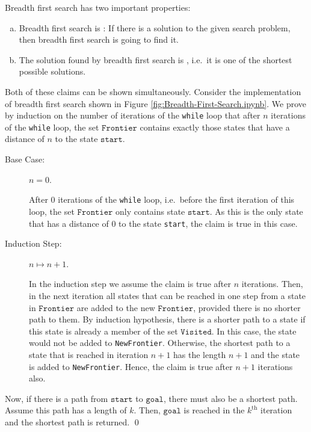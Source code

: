 Breadth first search has two important properties:
\begin{enumerate}[(a)]
\item Breadth first search is :  If there is a solution to the given
      search problem, then breadth first search is going to find it.
\item The solution found by breadth first search is ,  i.e.~it is one of the
      shortest possible solutions.
\end{enumerate}
\proof
Both of these claims can be shown simultaneously.  Consider the implementation of breadth first
search shown in Figure \ref{fig:Breadth-First-Search.ipynb}.  We prove by induction on the number of
iterations of the \texttt{while} loop that after $n$ iterations of the \texttt{while} loop,
the set $\texttt{Frontier}$ contains exactly those states that have a distance of $n$ to the state
$\texttt{start}$.  
\begin{description}
\item[Base Case:] $n = 0$.

      After $0$ iterations of the \texttt{while} loop, i.e.~before the first iteration of this loop,
      the set $\texttt{Frontier}$ only contains state $\texttt{start}$.  As this is the only state that has a
      distance of $0$ to the state \texttt{start}, the claim is true in this case.
\item[Induction Step:] $n \mapsto n+1$.

      In the induction step we assume the claim is true after $n$ iterations.  Then, in the next iteration all
      states that can be reached in one step from a state in $\texttt{Frontier}$ are added to the new $\texttt{Frontier}$,
      provided there is no shorter path to them.  By induction hypothesis, there is a shorter path to a state
      if this state is already a member of the set $\texttt{Visited}$.  In this case, the state would not be
      added to \texttt{NewFrontier}.  Otherwise, the shortest path to a state that is
      reached in iteration $n+1$ has the length $n+1$ and the state is added to \texttt{NewFrontier}.  Hence,
      the claim is true after $n+1$ iterations also.
\end{description}
Now, if there is a path from $\texttt{start}$ to $\texttt{goal}$, there must also be a shortest
path.  Assume this path has a length of $k$.  Then, $\texttt{goal}$ is reached in the $k^{\textrm{th}}$
iteration and the shortest path is returned.
\qed

